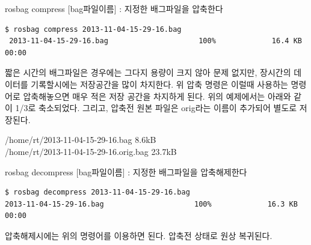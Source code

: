 \vspace{\baselineskip}
\noindent
{}\circled{\thenum} rosbag compress [bag파일이름] : 지정한 배그파일을 압축한다

\begin{lstlisting}[language=ROS]
$ rosbag compress 2013-11-04-15-29-16.bag 
 2013-11-04-15-29-16.bag                     100%             16.4 KB 00:00  
\end{lstlisting}

\noindent
짧은 시간의 배그파일은 경우에는 그다지 용량이 크지 않아 문제 없지만, 장시간의 데이터를 기록할시에는 저장공간을 많이 차지한다. 위 압축 명령은 이럴때 사용하는 명령어로 압축해놓으면 매우 적은 저장 공간을 차지하게 된다. 위의 예제에서는 아래와 같이 1/3로 축소되었다. 그리고, 압축전 원본 파일은 orig라는 이름이 추가되어 별도로 저장된다.

\vspace{\baselineskip}
\noindent
/home/rt/2013-11-04-15-29-16.bag 8.6kB\\
/home/rt/2013-11-04-15-29-16.orig.bag 23.7kB

\vspace{\baselineskip}
\noindent
{}\circled{\thenum} rosbag decompress [bag파일이름] : 지정한 배그파일을 압축해제한다

\begin{lstlisting}[language=ROS]
$ rosbag decompress 2013-11-04-15-29-16.bag 
2013-11-04-15-29-16.bag                     100%             16.3 KB 00:00  
\end{lstlisting}

\noindent
압축해제시에는 위의 명령어를 이용하면 된다. 압축전 상태로 원상 복귀된다.



